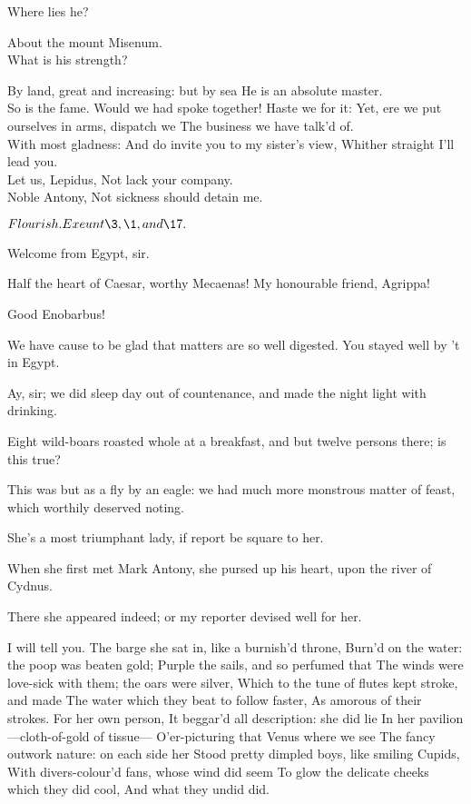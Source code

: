 \documentclass{book}
\begin{document}
\1	Where lies he?

\3	About the mount Misenum. \\

\1	What is his strength?

\3      By land, great and increasing: but by sea
	He is an absolute master. \\

\1	So is the fame.
	Would we had spoke together! Haste we for it:
	Yet, ere we put ourselves in arms, dispatch we
	The business we have talk'd of. \\

\3	With most gladness:
	And do invite you to my sister's view,
	Whither straight I'll lead you. \\

\1	Let us, Lepidus,
	Not lack your company. \\

	Noble Antony,
	Not sickness should detain me.

	\(Flourish. Exeunt \3, \1, and \17.\)

\begin{PROSE}

	Welcome from Egypt, sir.

	Half the heart of Caesar, worthy Mecaenas! My
	honourable friend, Agrippa!

\4	Good Enobarbus!

	We have cause to be glad that matters are so well
	digested. You stayed well by 't in Egypt.

	Ay, sir; we did sleep day out of countenance, and
	made the night light with drinking.

	Eight wild-boars roasted whole at a breakfast, and
	but twelve persons there; is this true?

	This was but as a fly by an eagle: we had much more
	monstrous matter of feast, which worthily deserved noting.

 She's a most triumphant lady, if report be square to
	her.

	When she first met Mark Antony, she pursed up
	his heart, upon the river of Cydnus.

\4	There she appeared indeed; or my reporter devised
	well for her.

\end{PROSE}

	I will tell you.
	The barge she sat in, like a burnish'd throne,
	Burn'd on the water: the poop was beaten gold;
	Purple the sails, and so perfumed that
	The winds were love-sick with them; the oars were silver,
	Which to the tune of flutes kept stroke, and made
	The water which they beat to follow faster,
	As amorous of their strokes. For her own person,
	It beggar'd all description: she did lie
	In her pavilion---cloth-of-gold of tissue---
	O'er-picturing that Venus where we see
	The fancy outwork nature: on each side her
	Stood pretty dimpled boys, like smiling Cupids,
	With divers-colour'd fans, whose wind did seem
	To glow the delicate cheeks which they did cool,
	And what they undid did. \\
\end{document}
